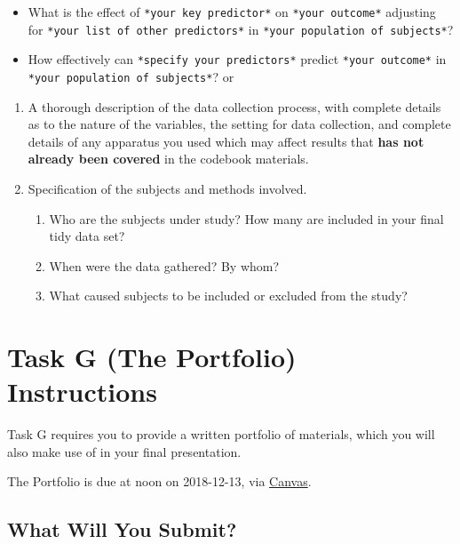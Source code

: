 \documentclass[]{book}
\providecommand{\tightlist}{%
  \setlength{\itemsep}{0pt}\setlength{\parskip}{0pt}}
\theoremstyle{definition}
\theoremstyle{definition}
\theoremstyle{definition}
\theoremstyle{remark}
\begin{document}
\begin{itemize}
\tightlist
\item
  What is the effect of \texttt{*your\ key\ predictor*} on
  \texttt{*your\ outcome*} adjusting for
  \texttt{*your\ list\ of\ other\ predictors*} in
  \texttt{*your\ population\ of\ subjects*}?
\item
  How effectively can \texttt{*specify\ your\ predictors*} predict
  \texttt{*your\ outcome*} in \texttt{*your\ population\ of\ subjects*}?
  or
\end{itemize}

\begin{enumerate}
\def\labelenumi{\arabic{enumi}.}
\setcounter{enumi}{1}
\item
  A thorough description of the data collection process, with complete
  details as to the nature of the variables, the setting for data
  collection, and complete details of any apparatus you used which may
  affect results that \textbf{has not already been covered} in the
  codebook materials.
\item
  Specification of the subjects and methods involved.

  \begin{enumerate}
  \def\labelenumii{\alph{enumii}.}
  \tightlist
  \item
    Who are the subjects under study? How many are included in your
    final tidy data set?
  \item
    When were the data gathered? By whom?
  \item
    What caused subjects to be included or excluded from the study?
  \end{enumerate}
\end{enumerate}

\hypertarget{taskG}{%
\chapter{Task G (The Portfolio) Instructions}\label{taskG}}

Task G requires you to provide a written portfolio of materials, which
you will also make use of in your final presentation.

The Portfolio is due at noon on 2018-12-13, via
\href{https://canvas.case.edu/}{Canvas}.

\hypertarget{what-will-you-submit}{%
\section{What Will You Submit?}\label{what-will-you-submit}}
\end{document}
